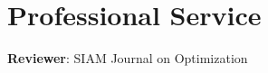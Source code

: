 \documentclass[letterpaper,10.8pt]{article}
\begin{document}
\section{Professional Service}
\begin{description}[font=$\bullet$]
\item \textbf{\color{MSLightBlue}Reviewer}: SIAM Journal on Optimization

\end{description}

\end{document}
